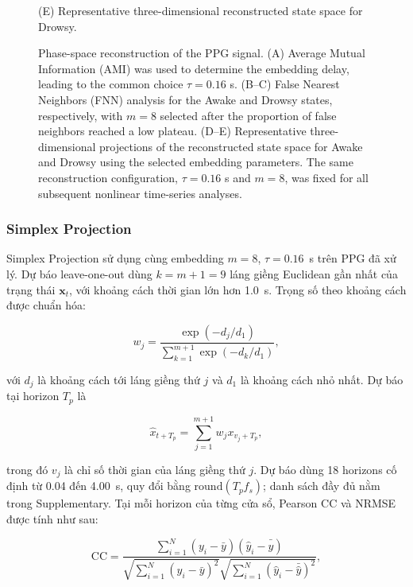 \begin{figure}[t]
\begin{minipage}[t]{0.40\textwidth}
        \vspace{0.25em}
        \small
        (E) Representative three-dimensional reconstructed state space for Drowsy.
    \end{minipage}

    \caption{
    Phase-space reconstruction of the PPG signal.
    (A) Average Mutual Information (AMI) was used to determine the embedding delay, leading to the common choice $\tau=0.16$ s.
    (B--C) False Nearest Neighbors (FNN) analysis for the Awake and Drowsy states, respectively, with $m=8$ selected after the proportion of false neighbors reached a low plateau.
    (D--E) Representative three-dimensional projections of the reconstructed state space for Awake and Drowsy using the selected embedding parameters.
    The same reconstruction configuration, $\tau=0.16$ s and $m=8$, was fixed for all subsequent nonlinear time-series analyses.
    }
    \label{fig:phase_space_reconstruction}
\end{figure}

\subsubsection{Simplex Projection}

Simplex Projection \cite{sugihara1990nonlinear} sử dụng cùng embedding $m=8$, $\tau=0.16$~s trên PPG đã xử lý. Dự báo leave-one-out dùng $k=m+1=9$ láng giềng Euclidean gần nhất của trạng thái $\mathbf{x}_t$, với khoảng cách thời gian lớn hơn 1.0~s. Trọng số theo khoảng cách được chuẩn hóa:

\begin{equation}
w_j =
\frac{
\exp\left(-d_j/d_1\right)
}{
\displaystyle\sum_{k=1}^{m+1}
\exp\left(-d_k/d_1\right)
},
\label{eq:simplex_weights}
\end{equation}

với $d_j$ là khoảng cách tới láng giềng thứ $j$ và $d_1$ là khoảng cách nhỏ nhất. Dự báo tại horizon $T_p$ là

\begin{equation}
\hat{x}_{t+T_p}
=
\sum_{j=1}^{m+1}
w_j x_{v_j+T_p},
\label{eq:simplex_prediction}
\end{equation}

trong đó $v_j$ là chỉ số thời gian của láng giềng thứ $j$. Dự báo dùng 18 horizons cố định từ 0.04 đến 4.00~s, quy đổi bằng $\mathrm{round}(T_p f_s)$; danh sách đầy đủ nằm trong Supplementary. Tại mỗi horizon của từng cửa sổ, Pearson CC và NRMSE được tính như sau:

\begin{equation}
    \mathrm{CC} =
    \frac{
    \sum_{i=1}^{N}
    \left(y_i-\bar{y}\right)
    \left(\hat{y}_i-\bar{\hat{y}}\right)
    }
    {
    \sqrt{
    \sum_{i=1}^{N}\left(y_i-\bar{y}\right)^2
    }
    \sqrt{
    \sum_{i=1}^{N}\left(\hat{y}_i-\bar{\hat{y}}\right)^2
    }
    },
    \label{eq:cc}
\end{equation}

